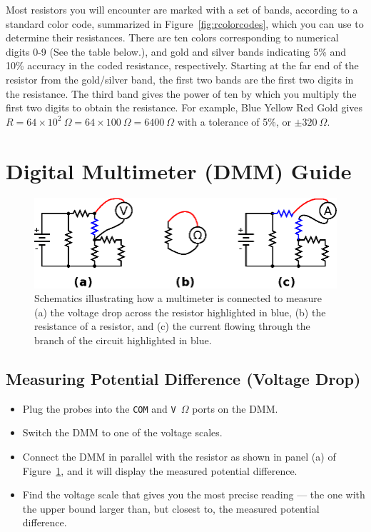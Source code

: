 \documentclass[11pt]{article}
\begin{document}
Most resistors you will encounter are marked with a set of bands,
according to a standard color code, summarized in
Figure~\ref{fig:rcolorcodes}, which you can use to determine their
resistances. There are ten colors corresponding to numerical digits
0-9 (See the table below.), and gold and silver bands indicating 5\%
and 10\% accuracy in the coded resistance, respectively.  Starting at
the far end of the resistor from the gold/silver band, the first two
bands are the first two digits in the resistance.  The third band
gives the power of ten by which you multiply the first two digits to
obtain the resistance. For example, Blue Yellow Red Gold gives $R = 64
\times 10^{2}~\Omega = 64 \times 100~\Omega = 6400~\Omega$ with a
tolerance of 5\%, or $\pm 320~\Omega$.

\section{Digital Multimeter (DMM) Guide}
\label{sec:dmm}

\begin{figure}[ht]
  \begin{center}
    \includegraphics{dmm.eps}
    
    \caption{Schematics illustrating how a multimeter is connected to
      measure (a) the voltage drop across the resistor highlighted in
      blue, (b) the resistance of a resistor, and (c) the current
      flowing through the branch of the circuit highlighted in blue.}
    \label{fig:dmm}
  \end{center}
\end{figure}

\subsection{Measuring Potential Difference (Voltage Drop)}

\begin{itemize}
\item Plug the probes into the \texttt{COM} and \texttt{V\,$\Omega$}
  ports on the DMM.

\item Switch the DMM to one of the voltage scales.
  
\item Connect the DMM in parallel with the resistor as shown in panel
  (a) of Figure~\ref{fig:dmm}, and it will display the measured
  potential difference.

\item Find the voltage scale that gives you the most
  precise reading --- the one with the upper bound larger than, but
  closest to, the measured potential difference.
\end{itemize}
\end{document}
